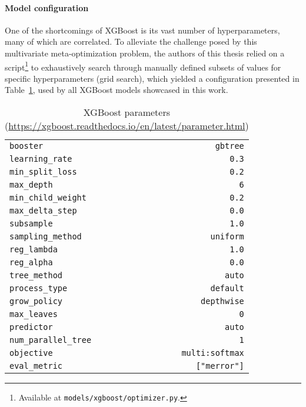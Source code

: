 \documentclass[../main.tex]{subfiles}
\begin{document}
\paragraph{Model configuration}
One of the shortcomings of XGBoost is its vast number of hyperparameters, many of which are correlated. To alleviate the challenge posed by this multivariate meta-optimization problem, the authors of this thesis relied on a script\footnote{Available at \texttt{models/xgboost/optimizer.py}.} to exhaustively search through manually defined subsets of values for specific hyperparameters (grid search), which yielded a configuration presented in Table~\ref{tab:xgboost_parameters}, used by all XGBoost models showcased in this work.
\begin{table}[h]
    \centering
    \caption{XGBoost parameters \\
    {\tiny (\url{https://xgboost.readthedocs.io/en/latest/parameter.html})}}
    \begin{tabular}{lr}
        \texttt{booster}              & \texttt{gbtree} \\
        \texttt{learning\_rate}        & \texttt{0.3} \\
        \texttt{min\_split\_loss}       & \texttt{0.2} \\
        \texttt{max\_depth}            & \texttt{6} \\
        \texttt{min\_child\_weight}     & \texttt{0.2} \\
        \texttt{max\_delta\_step}       & \texttt{0.0} \\
        \texttt{subsample}            & \texttt{1.0} \\
        \texttt{sampling\_method}      & \texttt{uniform} \\
        \texttt{reg\_lambda}           & \texttt{1.0} \\
        \texttt{reg\_alpha}            & \texttt{0.0} \\
        \texttt{tree\_method}          & \texttt{auto} \\
        \texttt{process\_type}         & \texttt{default} \\
        \texttt{grow\_policy}          & \texttt{depthwise} \\
        \texttt{max\_leaves}           & \texttt{0} \\
        \texttt{predictor}            & \texttt{auto} \\
        \texttt{num\_parallel\_tree}    & \texttt{1} \\
        \texttt{objective}            & \texttt{multi:softmax} \\
        \texttt{eval\_metric}          & \texttt{["merror"]}
    \end{tabular}
    \label{tab:xgboost_parameters}
\end{table}
\end{document}
